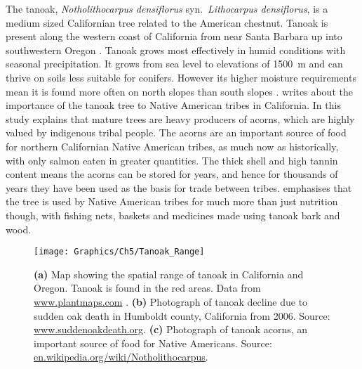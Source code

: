 The tanoak, \textit{Notholithocarpus densiflorus} syn.~\textit{Lithocarpus densiflorus}, is a medium sized Californian tree related to the American chestnut. Tanoak is present along the western coast of California from near Santa Barbara up into southwestern Oregon \citep[see Figure~\ref{fig:ch5:tanoak_range};][]{tappeiner_lithocarpus_1990}. Tanoak grows most effectively in humid conditions with seasonal precipitation. It grows from sea level to elevations of \SI{1500}{\meter} and can thrive on soils less suitable for conifers. However its higher moisture requirements mean it is found more often on north slopes than south slopes \citep{tappeiner_lithocarpus_1990}. \citet{bowcutt_tanoak_2013} writes about the importance of the tanoak tree to Native American tribes in California. In this study \citeauthor{bowcutt_tanoak_2013} explains that mature trees are heavy producers of acorns, which are highly valued by indigenous tribal people. The acorns are an important source of food for northern Californian Native American tribes, as much now as historically, with only salmon eaten in greater quantities. The thick shell and high tannin content means the acorns can be stored for years, and hence for thousands of years they have been used as the basis for trade between tribes. \citeauthor{bowcutt_tanoak_2013} emphasises that the tree is used by Native American tribes for much more than just nutrition though, with fishing nets, baskets and medicines made using tanoak bark and wood.

\begin{figure}
    \begin{center}
        \texttt{[image: Graphics/Ch5/Tanoak\_Range]}
        \caption[The tanoak tree: pictures and map of spatial range]{\textbf{(a)} Map showing the spatial range of tanoak in California and Oregon. Tanoak is found in the red areas. Data from \url{www.plantmaps.com} . \textbf{(b)} Photograph of tanoak decline due to sudden oak death in Humboldt county, California from 2006. Source: \url{www.suddenoakdeath.org}. \textbf{(c)} Photograph of tanoak acorns, an important source of food for Native Americans. Source: \url{en.wikipedia.org/wiki/Notholithocarpus}. \label{fig:ch5:tanoak_range}}
    \end{center}
\end{figure}

